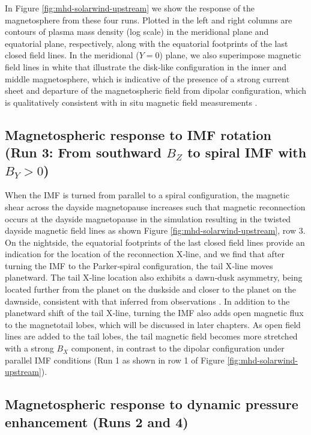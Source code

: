 In Figure \ref{fig:mhd-solarwind-upstream} we show the response of the magnetosphere from these four runs. Plotted in the left and right columns are contours of plasma mass density (log scale) in the meridional plane and equatorial plane, respectively, along with the equatorial footprints of the last closed field lines. In the meridional ($Y = 0$) plane, we also superimpose magnetic field lines in white that illustrate the disk‐like configuration in the inner and middle magnetosphere, which is indicative of the presence of a strong current sheet and departure of the magnetospheric field from dipolar configuration, which is qualitatively consistent with in situ magnetic field measurements \cite{Khurana2001}.

\subsection{Magnetospheric response to IMF rotation (Run 3: From southward \texorpdfstring{$B_Z$}{Bz} to spiral IMF with \texorpdfstring{$B_Y > 0$}{By>0}) }

When the IMF is turned from parallel to a spiral configuration, the magnetic shear across the dayside magnetopause increases such that magnetic reconnection occurs at the dayside magnetopause in the simulation resulting in the twisted dayside magnetic field lines as shown Figure \ref{fig:mhd-solarwind-upstream}, row 3. On the nightside, the equatorial footprints of the last closed field lines provide an indication for the location of the reconnection X‐line, and we find that after turning the IMF to the Parker‐spiral configuration, the tail X‐line moves planetward. The tail X‐line location also exhibits a dawn‐dusk asymmetry, being located further from the planet on the duskside and closer to the planet on the dawnside, consistent with that inferred from observations \cite{Vogt2010a,Vogt2014,Woch2002a}. In addition to the planetward shift of the tail X‐line, turning the IMF also adds open magnetic flux to the magnetotail lobes, which will be discussed in later chapters. As open field lines are added to the tail lobes, the tail magnetic field becomes more stretched with a strong $B_X$ component, in contrast to the dipolar configuration under parallel IMF conditions (Run 1 as shown in row 1 of Figure \ref{fig:mhd-solarwind-upstream}). 

\subsection{Magnetospheric response to dynamic pressure enhancement (Runs 2 and 4)}

